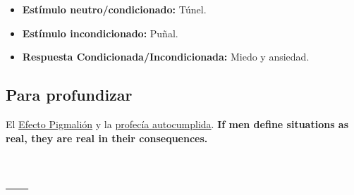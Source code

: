 \documentclass[palatino,nochap]{apuntesURJC}
\begin{document}
\begin{itemize}
\item \textbf{Estímulo neutro/condicionado:} Túnel.
\item \textbf{Estímulo incondicionado:} Puñal.
\item \textbf{Respuesta Condicionada/Incondicionada:} Miedo y ansiedad.
\end{itemize}


\section{Para profundizar}


El \href{https://es.wikipedia.org/wiki/Efecto\_Pigmali\%C3\%B3n}{Efecto Pigmalión} y la \href{https://es.wikipedia.org/wiki/Profec\%C3\%ADa\_autocumplida}{profecía autocumplida}. 
%
\textbf{If men define situations as real, they are real in their consequences.} 





\appendix

\chapter{---}


\printindex
\end{document}
